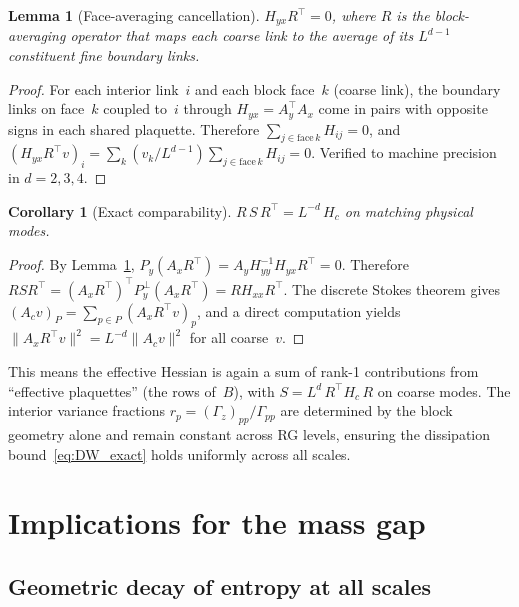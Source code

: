 \documentclass[11pt]{article}
\newtheorem{lemma}[theorem]{Lemma}
\newtheorem{corollary}[theorem]{Corollary}
\theoremstyle{definition}
\begin{document}
\begin{lemma}[Face-averaging cancellation]\label{lem:face_cancel}
$H_{yx} R^\top = 0$, where $R$ is the block-averaging operator that maps 
each coarse link to the average of its $L^{d-1}$ constituent fine boundary links.
\end{lemma}
\begin{proof}
For each interior link~$i$ and each block face~$k$ (coarse link), the 
boundary links on face~$k$ coupled to~$i$ through $H_{yx} = A_y^\top A_x$ 
come in pairs with opposite signs in each shared plaquette.  Therefore 
$\sum_{j \in \mathrm{face}\,k} H_{ij} = 0$, and 
$(H_{yx} R^\top v)_i = \sum_k (v_k/L^{d-1}) \sum_{j \in \mathrm{face}\,k} H_{ij} = 0$.
Verified to machine precision in $d = 2, 3, 4$.
\end{proof}

\begin{corollary}[Exact comparability]\label{cor:exact_comp}
$R\,S\,R^\top = L^{-d}\,H_c$ on matching physical modes.
\end{corollary}
\begin{proof}
By Lemma~\ref{lem:face_cancel}, 
$P_y(A_x R^\top) = A_y H_{yy}^{-1} H_{yx} R^\top = 0$.  Therefore 
$R S R^\top = (A_x R^\top)^\top P_y^\perp (A_x R^\top) = R H_{xx} R^\top$.
The discrete Stokes theorem gives $(A_c v)_P = \sum_{p \in P}(A_x R^\top v)_p$, 
and a direct computation yields 
$\|A_x R^\top v\|^2 = L^{-d}\|A_c v\|^2$ for all coarse~$v$.
\end{proof}

This means the effective Hessian is again a sum of rank-1 contributions 
from ``effective plaquettes'' (the rows of~$B$), with $S = L^d\,R^\top H_c\,R$ 
on coarse modes.  The interior variance fractions 
$r_p = (\Gamma_z)_{pp}/\Gamma_{pp}$ are determined by the block geometry 
alone and remain constant across RG levels, ensuring the dissipation 
bound~\eqref{eq:DW_exact} holds uniformly across all scales.


\section{Implications for the mass gap}\label{sec:massgap}

\subsection{Geometric decay of entropy at all scales}
\end{document}
